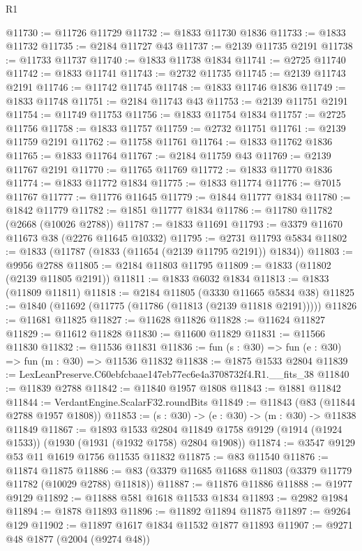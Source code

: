 \begin{lexlean}{R1}
\begin{coremodule}
@11730 := @11726 @11729
@11732 := @1833 @11730 @1836
@11733 := @1833 @11732
@11735 := @2184 @11727 @43
@11737 := @2139 @11735 @2191
@11738 := @11733 @11737
@11740 := @1833 @11738 @1834
@11741 := @2725 @11740
@11742 := @1833 @11741
@11743 := @2732 @11735
@11745 := @2139 @11743 @2191
@11746 := @11742 @11745
@11748 := @1833 @11746 @1836
@11749 := @1833 @11748
@11751 := @2184 @11743 @43
@11753 := @2139 @11751 @2191
@11754 := @11749 @11753
@11756 := @1833 @11754 @1834
@11757 := @2725 @11756
@11758 := @1833 @11757
@11759 := @2732 @11751
@11761 := @2139 @11759 @2191
@11762 := @11758 @11761
@11764 := @1833 @11762 @1836
@11765 := @1833 @11764
@11767 := @2184 @11759 @43
@11769 := @2139 @11767 @2191
@11770 := @11765 @11769
@11772 := @1833 @11770 @1836
@11774 := @1833 @11772 @1834
@11775 := @1833 @11774
@11776 := @7015 @11767
@11777 := @11776 @11645
@11779 := @1844 @11777 @1834
@11780 := @1842 @11779
@11782 := @1851 @11777 @1834
@11786 := @11780 @11782 (@2668 (@10026 @2788))
@11787 := @1833 @11691
@11793 := @3379 @11670 @11673 @38 (@2276 @11645 @10332)
@11795 := @2731 @11793 @5834
@11802 := @1833 (@11787 (@1833 (@11654 (@2139 @11795 @2191)) @1834))
@11803 := @9956 @2788
@11805 := @2184 @11803 @11795
@11809 := @1833 (@11802 (@2139 @11805 @2191))
@11811 := @1833 @6032 @1834
@11813 := @1833 (@11809 @11811)
@11818 := @2184 @11805 (@3330 @11665 @5834 @38)
@11825 := @1840 (@11692 (@11775 (@11786 (@11813 (@2139 @11818 @2191)))))
@11826 := @11681 @11825
@11827 := @11628 @11826
@11828 := @11624 @11827
@11829 := @11612 @11828
@11830 := @11600 @11829
@11831 := @11566 @11830
@11832 := @11536 @11831
@11836 := fun (s : @30) => fun (e : @30) => fun (m : @30) => @11536 @11832
@11838 := @1875 @1533 @2804
@11839 := LexLeanPreserve.C60ebfcbaae147eb77ec6e4a3708732f4.R1.__fits_38
@11840 := @11839 @2788
@11842 := @11840 @1957 @1808
@11843 := @1881 @11842
@11844 := VerdantEngine.ScalarF32.roundBits
@11849 := @11843 (@83 (@11844 @2788 @1957 @1808))
@11853 := (s : @30) -> (e : @30) -> (m : @30) -> @11838 @11849
@11867 := @1893
    @1533
    @2804
    @11849
    @1758
    @9129
    (@1914 (@1924 @1533))
    (@1930 (@1931 (@1932 @1758) @2804 @1908))
@11874 := @3547 @9129 @53 @11 @1619 @1756 @11535 @11832
@11875 := @83 @11540
@11876 := @11874 @11875
@11886 := @83 (@3379 @11685 @11688 @11803 (@3379 @11779 @11782 (@10029 @2788) @11818))
@11887 := @11876 @11886
@11888 := @1977 @9129
@11892 := @11888 @581 @1618 @11533 @1834
@11893 := @2982 @1984
@11894 := @1878 @11893
@11896 := @11892 @11894 @11875
@11897 := @9264 @129
@11902 := @11897 @1617 @1834 @11532 @1877 @11893
@11907 := @9271 @48 @1877 (@2004 (@9274 @48))

\end{coremodule}
\end{lexlean}
